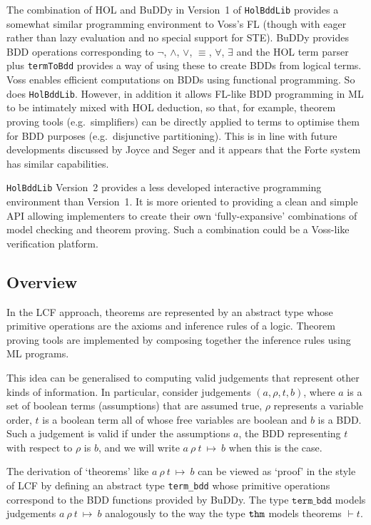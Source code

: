 \documentclass[12pt]{article}
\newcommand{\ty}[1]{\mbox{\tt #1}}
\newcommand{\ml}[1]{{\tt #1}}
\newcommand{\termbdd}[4]{\mbox{$#1~#2~#3~\mapsto~#4$}}
\newcommand\termbddty{\texttt{term\_bdd}\xspace}
\newcommand\HOL{HOL\xspace}
\newcommand{\Buddy}{BuDDy\xspace}
\begin{document}
The combination of \HOL{} and \Buddy{} in Version~1 of
{\tt{HolBddLib}} provides a somewhat similar programming environment
to Voss's FL (though with eager rather than lazy evaluation and no
special support for STE). \Buddy{} provides BDD operations
corresponding to $\neg$, $\wedge$, $\vee$, $\equiv$, $\forall$,
$\exists$ and the \HOL{} term parser plus \ml{termToBdd} provides a
way of using these to create BDDs from logical terms.  Voss enables
efficient computations on BDDs using functional programming. So does
\ml{HolBddLib}. However, in addition it allows FL-like BDD programming
in ML to be intimately mixed with \HOL{} deduction, so that, for
example, theorem proving tools (e.g.~simplifiers) can be directly
applied to terms to optimise them for BDD purposes (e.g.~disjunctive
partitioning).  This is in line with future developments discussed by
Joyce and Seger \cite{JoyceSeger} and it appears that the Forte system
has similar capabilities.

{\tt{HolBddLib}} Version~2 provides a less developed interactive
programming environment than Version~1. It is more oriented to
providing a clean and simple API allowing implementers to create their
own `fully-expansive' combinations of model checking and theorem
proving. Such a combination could be a Voss-like verification
platform.

\subsection*{Overview}


In the LCF approach, theorems are represented by an abstract type
whose primitive operations are the axioms and inference rules of a
logic.  Theorem proving tools are implemented by composing together
the inference rules using ML programs.

This idea can be generalised to computing valid judgements that
represent other kinds of information. In particular, consider
judgements $(a,\rho,t,b)$, where $a$ is a set of boolean terms
(assumptions) that are assumed true, $\rho$ represents a variable
order, $t$ is a boolean term all of whose free variables are boolean
and $b$ is a BDD. Such a judgement is valid if under the assumptions
$a$, the BDD representing $t$ with respect to $\rho$ is $b$, and we
will write \termbdd{a}{\rho}{t}{b} when this is the case.

The derivation of `theorems' like \termbdd{a}{\rho}{t}{b} can be viewed
as `proof' in the style of LCF by defining an abstract type \termbddty{}
whose primitive operations correspond to the BDD functions provided by \Buddy.
The type $\termbddty$ models judgements $\termbdd{a}{\rho}{t}{b}$ analogously
to the way the type $\ty{thm}$ models theorems $\vdash t$.
\end{document}
